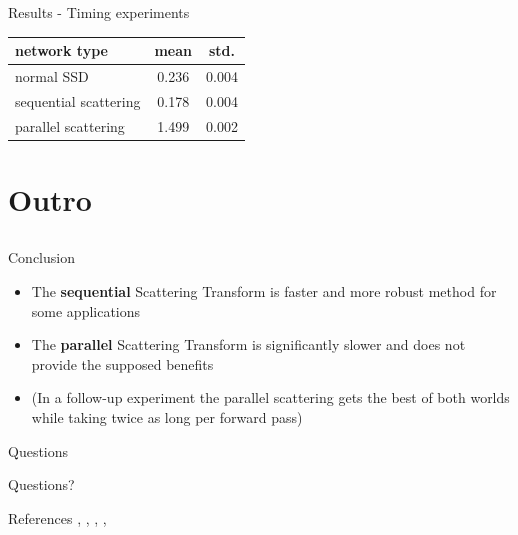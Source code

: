 \documentclass[compress]{beamer}
\begin{document}
	\begin{frame}{Results - Timing experiments}
		\begin{table}[!htb]
			\centering
			\begin{tabular}{lcc}
				\toprule
				network type & mean & std. \\
				\midrule
				normal SSD & 0.236 & 0.004 \\
				sequential scattering & 0.178 & 0.004 \\
				parallel scattering & 1.499 & 0.002 \\
				\bottomrule
			\end{tabular}
			\label{table:timing_evaluation}
		\end{table}
	\end{frame}
	\section{Outro}
	\subsection{ } %
	\begin{frame}{Conclusion}
		\begin{itemize}
			\item The \textbf{sequential} Scattering Transform is faster and more robust method for some applications
			\item The \textbf{parallel} Scattering Transform is significantly slower and does not provide the supposed benefits 
			\item (In a follow-up experiment the parallel scattering gets the best of both worlds while taking twice as long per forward pass)
		\end{itemize}
	\end{frame}
	\begin{frame}{Questions}
		\begin{center}
			\huge{Questions?}
		\end{center}
	\end{frame}
	\begin{frame}[shrink=30]{References}
		\cite{scatteringTransform2012}, \cite{InvariantScatteringTextureDiscrimination2013}, \cite{DeepRotoTranslation2014}, 
		\cite{ScalingTheScatteringTransform2017},
		\cite{3DScatteringTransformNeuro2017}
		
		\small
	\end{frame}
\end{document}
